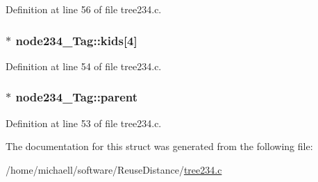 Definition at line 56 of file tree234.c.\hypertarget{structnode234___tag_a0f783514c021d86027beb3211b43f3b7}{
\subsubsection[{kids}]{$\ast$ {\bf node234\_\-Tag::kids}\mbox{[}4\mbox{]}}}
\label{structnode234___tag_a0f783514c021d86027beb3211b43f3b7}


Definition at line 54 of file tree234.c.\hypertarget{structnode234___tag_a3c3bdead5844de4df21b2980e7409157}{
\subsubsection[{parent}]{$\ast$ {\bf node234\_\-Tag::parent}}}
\label{structnode234___tag_a3c3bdead5844de4df21b2980e7409157}


Definition at line 53 of file tree234.c.

The documentation for this struct was generated from the following file:\begin{DoxyCompactItemize}
\item 
/home/michaell/software/ReuseDistance/\hyperlink{tree234_8c}{tree234.c}\end{DoxyCompactItemize}
